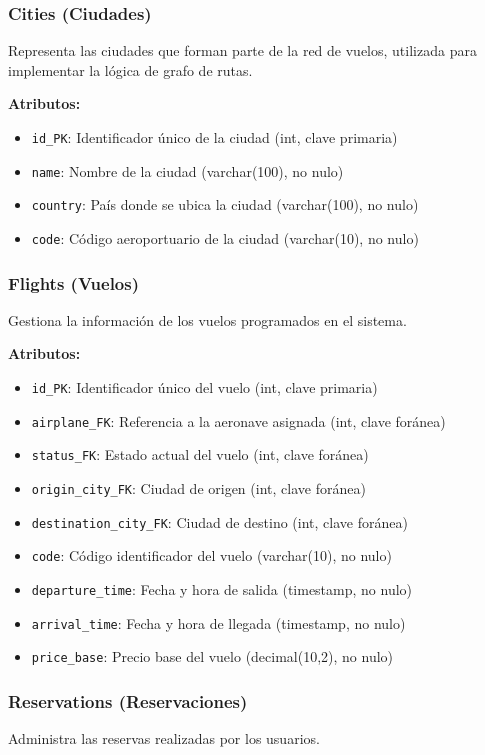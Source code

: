 \documentclass[12pt,a4paper]{article}
\begin{document}
\subsubsection{Cities (Ciudades)}
Representa las ciudades que forman parte de la red de vuelos, utilizada para implementar la lógica de grafo de rutas.

\textbf{Atributos:}
\begin{itemize}
    \item \texttt{id\_PK}: Identificador único de la ciudad (int, clave primaria)
    \item \texttt{name}: Nombre de la ciudad (varchar(100), no nulo)
    \item \texttt{country}: País donde se ubica la ciudad (varchar(100), no nulo)
    \item \texttt{code}: Código aeroportuario de la ciudad (varchar(10), no nulo)
\end{itemize}

\subsubsection{Flights (Vuelos)}
Gestiona la información de los vuelos programados en el sistema.

\textbf{Atributos:}
\begin{itemize}
    \item \texttt{id\_PK}: Identificador único del vuelo (int, clave primaria)
    \item \texttt{airplane\_FK}: Referencia a la aeronave asignada (int, clave foránea)
    \item \texttt{status\_FK}: Estado actual del vuelo (int, clave foránea)
    \item \texttt{origin\_city\_FK}: Ciudad de origen (int, clave foránea)
    \item \texttt{destination\_city\_FK}: Ciudad de destino (int, clave foránea)
    \item \texttt{code}: Código identificador del vuelo (varchar(10), no nulo)
    \item \texttt{departure\_time}: Fecha y hora de salida (timestamp, no nulo)
    \item \texttt{arrival\_time}: Fecha y hora de llegada (timestamp, no nulo)
    \item \texttt{price\_base}: Precio base del vuelo (decimal(10,2), no nulo)
\end{itemize}

\subsubsection{Reservations (Reservaciones)}
Administra las reservas realizadas por los usuarios.
\end{document}
